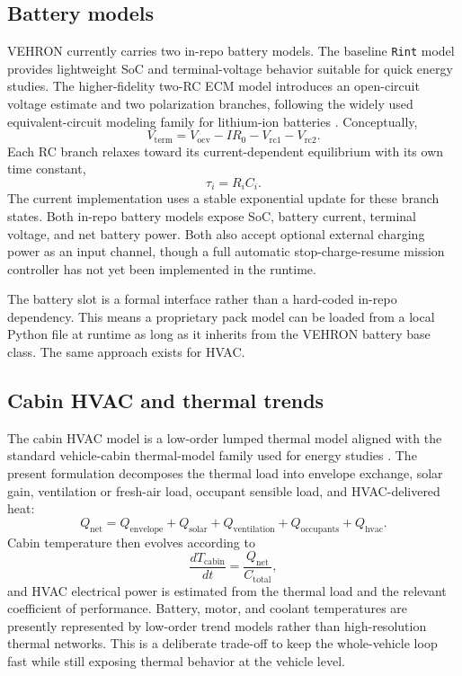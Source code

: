 \documentclass[11pt,a4paper]{article}
\begin{document}
\subsection{Battery models}
VEHRON currently carries two in-repo battery models. The baseline \texttt{Rint} model provides lightweight SoC and terminal-voltage behavior suitable for quick energy studies. The higher-fidelity two-RC ECM model introduces an open-circuit voltage estimate and two polarization branches, following the widely used equivalent-circuit modeling family for lithium-ion batteries \citep{hu2012ecm,su2019ecm}. Conceptually,
\begin{equation}
V_{\mathrm{term}} = V_{\mathrm{ocv}} - I R_0 - V_{\mathrm{rc1}} - V_{\mathrm{rc2}}.
\end{equation}
Each RC branch relaxes toward its current-dependent equilibrium with its own time constant,
\begin{equation}
\tau_i = R_i C_i.
\end{equation}
The current implementation uses a stable exponential update for these branch states. Both in-repo battery models expose SoC, battery current, terminal voltage, and net battery power. Both also accept optional external charging power as an input channel, though a full automatic stop-charge-resume mission controller has not yet been implemented in the runtime.

The battery slot is a formal interface rather than a hard-coded in-repo dependency. This means a proprietary pack model can be loaded from a local Python file at runtime as long as it inherits from the VEHRON battery base class. The same approach exists for HVAC.

\subsection{Cabin HVAC and thermal trends}
The cabin HVAC model is a low-order lumped thermal model aligned with the standard vehicle-cabin thermal-model family used for energy studies \citep{marcos2014cabin,torregrosa2015cabin,noreen2019thermal,cabreview2024}. The present formulation decomposes the thermal load into envelope exchange, solar gain, ventilation or fresh-air load, occupant sensible load, and HVAC-delivered heat:
\begin{equation}
Q_{\mathrm{net}} =
Q_{\mathrm{envelope}} +
Q_{\mathrm{solar}} +
Q_{\mathrm{ventilation}} +
Q_{\mathrm{occupants}} +
Q_{\mathrm{hvac}}.
\end{equation}
Cabin temperature then evolves according to
\begin{equation}
\frac{dT_{\mathrm{cabin}}}{dt} = \frac{Q_{\mathrm{net}}}{C_{\mathrm{total}}},
\end{equation}
and HVAC electrical power is estimated from the thermal load and the relevant coefficient of performance. Battery, motor, and coolant temperatures are presently represented by low-order trend models rather than high-resolution thermal networks. This is a deliberate trade-off to keep the whole-vehicle loop fast while still exposing thermal behavior at the vehicle level.
\end{document}
